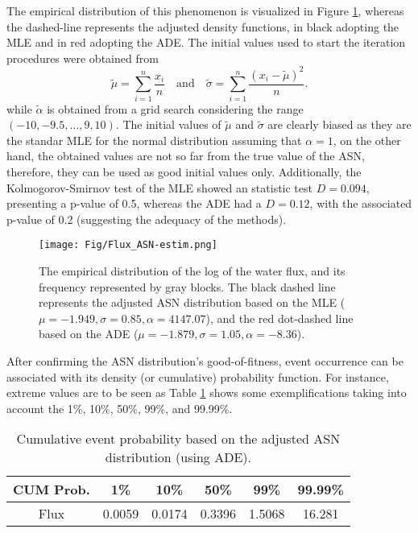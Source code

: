 \documentclass[]{interact}
\theoremstyle{plain}%
\theoremstyle{definition}
\theoremstyle{remark}
\begin{document}
The empirical distribution of this phenomenon is visualized in Figure \ref{fig:ASN-est}, whereas the dashed-line represents the adjusted density functions, in black adopting the MLE and in red adopting the ADE. The initial values used to start the iteration procedures were obtained from
\begin{equation*}
\tilde{\mu}=\sum_{i=1}^{n}\frac{x_i}{n} \quad \mbox{and} \quad  \tilde{\sigma}=\sum_{i=1}^{n}\frac{(x_i-\tilde{\mu})^2}{n}.
\end{equation*}
while $\tilde{\alpha}$ is obtained from a grid search considering the range $(-10,-9.5,\ldots,9,10)$. The initial values of $\tilde{\mu}$ and $\tilde{\sigma}$ are clearly biased as they are the standar MLE for the normal distribution assuming that $\alpha=1$, on the other hand, the obtained values are not so far from the true value of the ASN, therefore, they can be used as good initial values only. Additionally, the Kolmogorov-Smirnov test of the MLE showed an statistic test $D = 0.094$, presenting a p-value of 0.5, whereas the ADE had a $D = 0.12$, with the associated p-value of 0.2 (suggesting the adequacy of the methods).


\begin{figure}
    \centering
    \texttt{[image: Fig/Flux\_ASN-estim.png]}
    \caption{The empirical distribution of the log of the water flux, and its frequency represented by gray blocks. The black dashed line represents the adjusted ASN distribution based on the MLE ($\mu=-1.949,\sigma=0.85,\alpha=4147.07$), and the red dot-dashed line based on the ADE ($\mu=-1.879,\sigma=1.05,\alpha=-8.36$).}
    \label{fig:ASN-est}
\end{figure}

After confirming the ASN distribution's good-of-fitness, event occurrence can be associated with its density (or cumulative) probability function. For instance, extreme values are to be seen as Table \ref{tab:ASNprob} shows some exemplifications taking into account the 1\%, 10\%, 50\%, 99\%, and 99.99\%.


\begin{table}[!h]
\centering
\caption{Cumulative event probability based on the adjusted ASN distribution (using ADE).}
\begin{tabular}{c|c|c|c|c|c}
\hline
CUM Prob. & 1\% & 10\% & 50\% & 99\% & 99.99\% \\ \hline
Flux & 0.0059 & 0.0174 & 0.3396 & 1.5068 & 16.281 \\ \hline
\end{tabular}
\label{tab:ASNprob}
\end{table}
\end{document}
